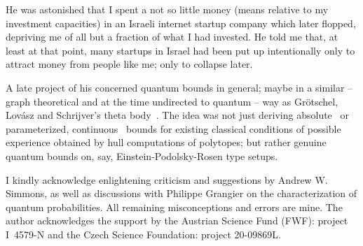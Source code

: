 \documentclass[%
  twocolumn,
 showpacs,
 showkeys,
 preprintnumbers,
 amsmath,amssymb,
 aps,
  pra,
  longbibliography,
 ]{revtex4-1}
\begin{document}
He was astonished that I spent a not so little money (means relative to my investment capacities)
in an Israeli internet startup company which later flopped, depriving me of all but a fraction of what I had invested.
He told me that, at least at that point,
many startups in Israel had been put up intentionally only to attract money from people like me;
only to collapse later.

A late project of his concerned quantum bounds in general;
maybe in a similar -- graph theoretical and at the time undirected to quantum -- way
as Gr{\"o}tschel, Lov{\'a}sz and Schrijver's
theta body~\citep{GroetschelLovaszSchrijver1986,Cabello-2014-gtatqc}.
The idea was not just deriving absolute~\citep{cirelson:80} or parameterized,
continuous~\citep{filipp-svo-04-qpoly,filipp-svo-04-qpoly-prl}  bounds
for existing classical conditions of possible experience obtained by hull computations of polytopes;
but rather genuine quantum bounds on, say, Einstein-Podolsky-Rosen type setups.

\begin{acknowledgments}
I kindly acknowledge enlightening criticism and suggestions by Andrew W. Simmons,
as well as discussions with Philippe Grangier on the characterization of quantum probabilities.
All remaining misconceptions and errors are mine.
The author acknowledges the support by the Austrian Science Fund (FWF): project I~4579-N and the Czech Science Foundation: project 20-09869L.
\end{acknowledgments}


\end{document}
